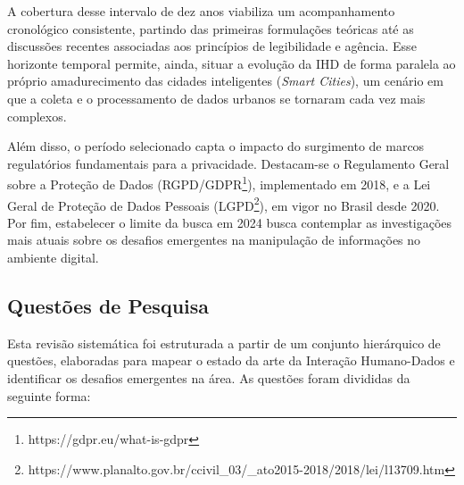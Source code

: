 \documentclass[
	12pt,				%
	oneside,			%
	a4paper,			%
	english,			%
	brazil				%
	]{abntex2ppgsi}
\begin{document}
    A cobertura desse intervalo de dez anos viabiliza um acompanhamento cronológico consistente, partindo das primeiras formulações teóricas até as discussões recentes associadas aos princípios de legibilidade e agência. Esse horizonte temporal permite, ainda, situar a evolução da IHD de forma paralela ao próprio amadurecimento das cidades inteligentes (\textit{Smart Cities}), um cenário em que a coleta e o processamento de dados urbanos se tornaram cada vez mais complexos.

   Além disso, o período selecionado capta o impacto do surgimento de marcos regulatórios fundamentais para a privacidade. Destacam-se o Regulamento Geral sobre a Proteção de Dados (RGPD/GDPR\footnote{https://gdpr.eu/what-is-gdpr}), implementado em 2018, e a Lei Geral de Proteção de Dados Pessoais (LGPD\footnote{https://www.planalto.gov.br/ccivil\_03/\_ato2015-2018/2018/lei/l13709.htm}), em vigor no Brasil desde 2020. Por fim, estabelecer o limite da busca em 2024 busca contemplar as investigações mais atuais sobre os desafios emergentes na manipulação de informações no ambiente digital.


\subsection{Questões de Pesquisa} \label{questoesdepesquisa}

    Esta revisão sistemática foi estruturada a partir de um conjunto hierárquico de questões, elaboradas para mapear o estado da arte da Interação Humano-Dados e identificar os desafios emergentes na área. As questões foram divididas da seguinte forma:
\end{document}
